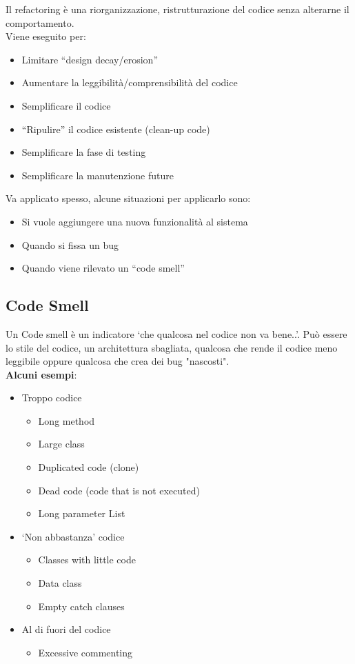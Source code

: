 Il refactoring \`e una riorganizzazione, ristrutturazione del codice senza alterarne il comportamento.\\
Viene eseguito per:
\begin{itemize}
    \item Limitare “design decay/erosion”
    \item Aumentare la leggibilità/comprensibilità del codice
    \item Semplificare il codice
    \item “Ripulire” il codice esistente (clean-up code)
    \item Semplificare la fase di testing
    \item Semplificare la manutenzione future
\end{itemize}

\noindent Va applicato spesso, alcune situazioni per applicarlo sono:
\begin{itemize}
    \item Si vuole aggiungere una nuova funzionalità al sistema
    \item Quando si fissa un bug
    \item Quando viene rilevato un “code smell”
\end{itemize}

\subsection{Code Smell}
Un Code smell \`e un indicatore ‘che qualcosa nel codice non va bene..’. Può essere lo stile del codice, un architettura sbagliata, qualcosa che rende il codice meno leggibile oppure qualcosa che crea dei bug "nascosti".\\
\textbf{Alcuni esempi}:
\begin{itemize}
    \item Troppo codice
    \begin{itemize}
        \item Long method
        \item Large class
        \item Duplicated code (clone)
        \item Dead code (code that is not executed)
        \item Long parameter List
    \end{itemize}
    
    \item ‘Non abbastanza’ codice
    \begin{itemize}
        \item Classes with little code
        \item Data class
        \item Empty catch clauses
    \end{itemize}
    
    \item Al di fuori del codice
    \begin{itemize}
        \item Excessive commenting
    \end{itemize}
\end{itemize}